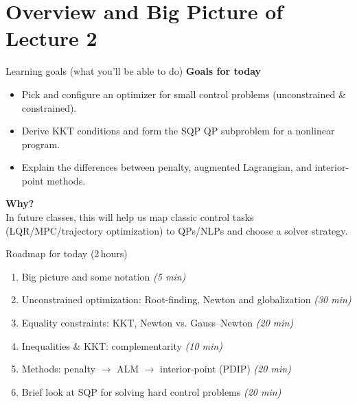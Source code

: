
\begin{frame}[plain]
  \titlepage
\end{frame}
\section{Overview and Big Picture of Lecture 2}

\begin{frame}{Learning goals (what you’ll be able to do)}
\textbf{Goals for today}
\begin{itemize}
\item Pick and configure an optimizer for small control problems (unconstrained \& constrained).
\item Derive KKT conditions and form the SQP QP subproblem for a nonlinear program.
\item Explain the differences between penalty, augmented Lagrangian, and interior-point methods.
\end{itemize}
\textbf{Why?}\\
In future classes, this will help us map classic control tasks (LQR/MPC/trajectory optimization) to QPs/NLPs and choose a solver strategy.
\end{frame}

\begin{frame}{Roadmap for today (2\,hours)}
\begin{enumerate}
\item Big picture and some notation \hfill \textit{(5 min)}
\item Unconstrained optimization: Root-finding, Newton and globalization \hfill \textit{(30 min)}
\item Equality constraints: KKT, Newton vs. Gauss–Newton \hfill \textit{(20 min)}
\item Inequalities \& KKT: complementarity \hfill \textit{(10 min)}
\item Methods: penalty $\rightarrow$ ALM $\rightarrow$ interior-point (PDIP) \hfill \textit{(20 min)}
\item Brief look at SQP for solving hard control problems \hfill \textit{(20 min)} 
\end{enumerate}
\end{frame}



